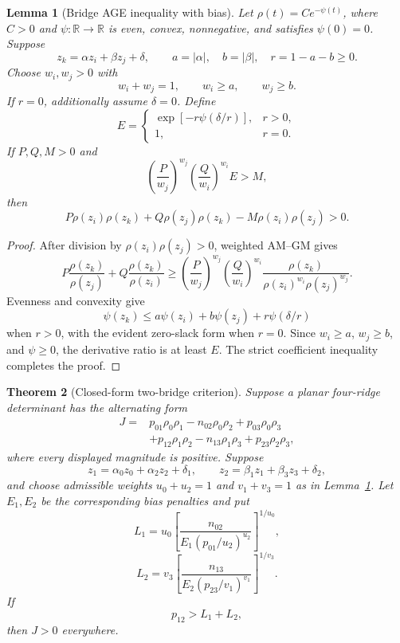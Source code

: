\documentclass[11pt]{article}
\newtheorem{theorem}{Theorem}[section]
\newtheorem{lemma}[theorem]{Lemma}
\theoremstyle{remark}
\newcommand{\R}{\mathbb R}
\begin{document}
\begin{lemma}[Bridge AGE inequality with bias]\label{lem:age}
Let $\rho(t)=C e^{-\psi(t)}$, where $C>0$ and $\psi:\R\to\R$ is even, convex, nonnegative, and satisfies $\psi(0)=0$. Suppose
\[
 z_k=\alpha z_i+\beta z_j+\delta,
 \qquad
 a=|\alpha|,\quad b=|\beta|,\quad r=1-a-b\ge0.
\]
Choose $w_i,w_j>0$ with
\[
 w_i+w_j=1,\qquad w_i\ge a,\qquad w_j\ge b.
\]
If $r=0$, additionally assume $\delta=0$. Define
\[
 E=\begin{cases}
 \exp\!\left[-r\psi\!\left(\delta/r\right)\right],&r>0,\\
 1,&r=0.
 \end{cases}
\]
If $P,Q,M>0$ and
\[
 \left(\frac{P}{w_j}\right)^{w_j}
 \left(\frac{Q}{w_i}\right)^{w_i}E>M,
\]
then
\[
 P\rho(z_i)\rho(z_k)+Q\rho(z_j)\rho(z_k)-M\rho(z_i)\rho(z_j)>0.
\]
\end{lemma}

\begin{proof}
After division by $\rho(z_i)\rho(z_j)>0$, weighted AM--GM gives
\[
 P\frac{\rho(z_k)}{\rho(z_j)}
 +Q\frac{\rho(z_k)}{\rho(z_i)}
 \ge
 \left(\frac{P}{w_j}\right)^{w_j}
 \left(\frac{Q}{w_i}\right)^{w_i}
 \frac{\rho(z_k)}{\rho(z_i)^{w_i}\rho(z_j)^{w_j}}.
\]
Evenness and convexity give
\[
 \psi(z_k)\le a\psi(z_i)+b\psi(z_j)+r\psi(\delta/r)
\]
when $r>0$, with the evident zero-slack form when $r=0$. Since $w_i\ge a$, $w_j\ge b$, and $\psi\ge0$, the derivative ratio is at least $E$. The strict coefficient inequality completes the proof.
\end{proof}

\begin{theorem}[Closed-form two-bridge criterion]\label{thm:two-bridge}
Suppose a planar four-ridge determinant has the alternating form
\[
\begin{aligned}
J={}&p_{01}\rho_0\rho_1-n_{02}\rho_0\rho_2+p_{03}\rho_0\rho_3\\
&+p_{12}\rho_1\rho_2-n_{13}\rho_1\rho_3+p_{23}\rho_2\rho_3,
\end{aligned}
\]
where every displayed magnitude is positive. Suppose
\[
 z_1=\alpha_0z_0+\alpha_2z_2+\delta_1,
 \qquad
 z_2=\beta_1z_1+\beta_3z_3+\delta_2,
\]
and choose admissible weights $u_0+u_2=1$ and $v_1+v_3=1$ as in Lemma~\ref{lem:age}. Let $E_1,E_2$ be the corresponding bias penalties and put
\[
 L_1=u_0\left[
 \frac{n_{02}}
 {E_1(p_{01}/u_2)^{u_2}}
 \right]^{1/u_0},
\]
\[
 L_2=v_3\left[
 \frac{n_{13}}
 {E_2(p_{23}/v_1)^{v_1}}
 \right]^{1/v_3}.
\]
If
\[
 p_{12}>L_1+L_2,
\]
then $J>0$ everywhere.
\end{theorem}
\end{document}
